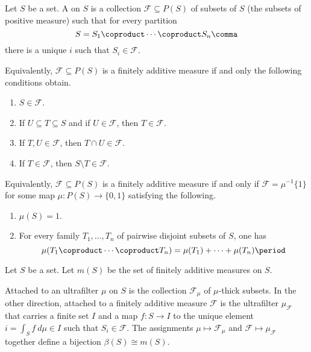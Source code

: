 \begin{definition}
	Let $ S $ be a set.
	A  on $ S $
	is a collection $ \mathscr{F} \subseteq P(S) $
	of subsets of $ S $
	(the subsets of positive measure)
	such that for every partition
	\[
		S = S_1 \coproduct \cdots \coproduct S_n \comma
	\]
	there is a unique $ i $ such that $ S_i \in \mathscr{F} $.

	Equivalently, $ \mathscr{F} \subseteq P(S) $ is
	a finitely additive measure
	if and only the following conditions obtain.
	\begin{enumerate}
		\item $ S \in \mathscr{F} $.
		\item If $ U \subseteq T \subseteq S $ and if
			$ U \in \mathscr{F} $, then
			$ T \in \mathscr{F} $.
		\item If $ T, U \in \mathscr{F} $, then
			$ T \cap U \in \mathscr{F} $.
		\item If $ T \in \mathscr{F} $, then
			$ S \setminus T \in \mathscr{F} $.
	\end{enumerate}

	Equivalently, $ \mathscr{F} \subseteq P(S) $ is
	a finitely additive measure if and only if
	$ \mathscr{F} = \mu^{-1}\{1\} $ for some map
	$ \mu \colon P(S) \to \{0, 1\} $
	satisfying the following.
	\begin{enumerate}
		\item $ \mu(S) = 1 $.
		\item For every family $ T_1, \dots, T_n $
			of pairwise disjoint subsets of $ S $,
			one has
			\[
				\mu(T_1 \coproduct
				\cdots
				\coproduct T_n) = 
				\mu(T_1) +
				\cdots
				+ \mu(T_n) \period
			\]
	\end{enumerate}
\end{definition}

\begin{construction}
	Let $ S $ be a set.
	Let $ m(S) $ be the set of
	finitely additive measures on $ S $.

	Attached to an ultrafilter $ \mu $ on $ S $ is 
	the collection $ \mathscr{F}_{\mu} $ of $ \mu $-thick subsets.
	In the other direction,
	attached to a finitely additive measure $ \mathscr{F} $ 
	is the ultrafilter $\mu_{\mathscr{F}}$ that
	carries a finite set $ I $ and a map $ f \colon S \to I $
	to the unique element $ i = \int_S f \ d \mu \in I $
	such that $ S_i \in \mathscr{F}$.
	The assignments $ \mu \mapsto \mathscr{F}_{\mu} $ and
	$ \mathscr{F} \mapsto \mu_{\mathscr{F}} $
	together define a bijection $ \beta(S) \cong m(S) $.
\end{construction}

